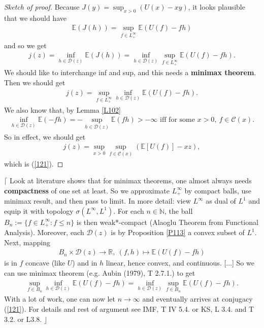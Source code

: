 \documentclass[12pt,a4paper, twoside]{article}
\theoremstyle{definition}
\newcommand{\EE}{\mathbb{E}} %
\begin{document}
\begin{proof}[Sketch of proof] Because $J(y) = \sup_{x >0} (U(x)-xy)$, it looks plausible that we should have  \begin{align*}
\EE(J(h)) = \sup_{f \in L_+^\infty} \EE(U(f)-fh)
\end{align*}
and so we get 
\begin{align*}
j(z) = \inf_{h \in \mathcal{D}(z)} \EE(J(h)) = \inf_{h \in \mathcal{D}(z)} \sup_{f \in L_+^\infty} \EE(U(f)-fh).
\end{align*}
We should like to interchange inf and sup, and this needs a \textbf{minimax theorem}. Then we should get 
\begin{align*}
j(z)= \sup_{f \in L_+^\infty} \inf_{h \in \mathcal{D}(z)} \EE(U(f)-fh). 
\end{align*}
We also know that, by Lemma \ref{L102} 
\begin{align*}
\inf_{h \in \mathcal{D}(z)} \EE(-fh) = - \sup_{h \in \mathcal{D}(z)} \EE(fh) > - \infty \text{ iff for some } x>0, \ f \in \mathcal{C}(x).
\end{align*}
So in effect, we should get 
\begin{align*}
j(z) = \sup_{x >0} \sup_{f \in \mathcal{C}(x)} ( \EE[U(f)]-xz),
\end{align*}
which is (\ref{121}). 
\end{proof}
$\lceil$ Look at literature shows that for minimax theorems, one almost always needs \textbf{compactness} of one set at least. So we approximate $L_+^\infty$ by compact balls,  use minimax result,  and then pass to limit. In more detail: view $L^\infty$ as dual of $L^1$ and equip it with topology $\sigma( L^\infty, L^1)$. For each $n \in \mathbb{N}$, the ball $B_n := \{ f \in L_+^\infty : f \leq n \}$ is then weak*-compact (Alaoglu Theorem from Functional Analysis). Moreover, each $\mathcal{D}(z)$ is by Proposition \ref{P113} a convex subset of $L^1$. Next, mapping \begin{align*}
B_n \times \mathcal{D}(z) \to \mathbb{R}, \ (f,h) \mapsto \EE(U(f)-fh)
\end{align*}
is in $f$ concave (like $U$) and in $h$ linear, hence convex, and continuous. [...] So we can use minimax theorem (e.g. Aubin (1979), T 2.7.1.) to get 
\begin{align*}
\sup_{f \in B_n} \inf_{h \in \mathcal{D}(z)} \EE(U(f)-fh) = \inf_{h \in \mathcal{D}(z)} \sup_{f \in B_n} \EE(U(f)-fh).
\end{align*}
With a lot of work, one can now let $n \to \infty$ and eventually arrives at conjugacy (\ref{121}). For details and rest of argument see IMF, T IV 5.4. or KS, L 3.4. and T 3.2. or L3.8. \hfill $\rfloor$ 
\end{document}
